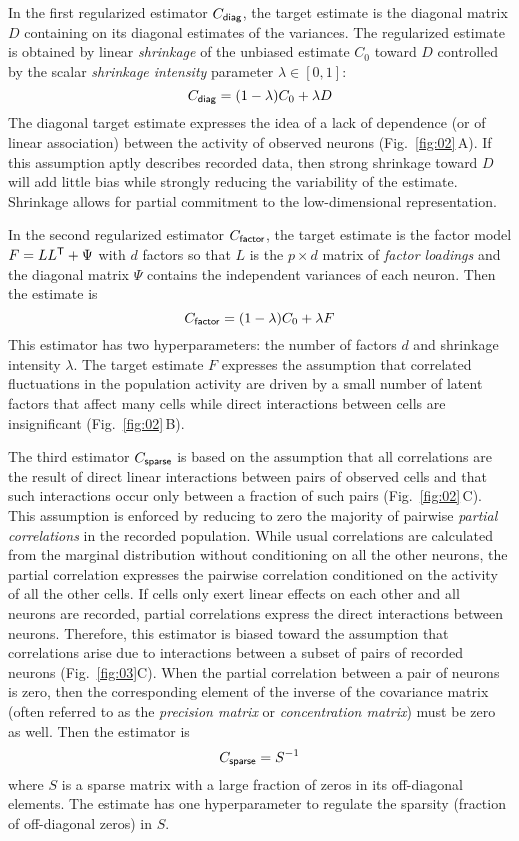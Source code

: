 \documentclass[10pt]{article}
\newcommand{\T}{{\sf T}}
\begin{document}
In the first regularized estimator $C_{\sf diag}$, the target estimate is the diagonal matrix $D$ containing on its diagonal estimates of the variances.
The regularized estimate is obtained by linear \emph{shrinkage} of the unbiased estimate $C_0$ toward $D$ controlled by the scalar \emph{shrinkage intensity} parameter $\lambda \in [0, 1]$:
\begin{equation}
C_{\sf diag} = (1-\lambda) C_0 + \lambda D
\end{equation}
The diagonal target estimate expresses the idea of a lack of dependence (or of linear association) between the activity of observed neurons (Fig.~\ref{fig:02}\,A).  
If this assumption aptly describes recorded data, then strong shrinkage toward $D$ will add little bias while strongly reducing the variability of the estimate. Shrinkage allows for partial commitment to the low-dimensional representation.  

In the second regularized estimator $C_{\sf factor}$, the target estimate is the factor model $F =  L L^\T + \Psi$ with $d$ factors so that $L$ is the $p\times d$ matrix of \emph{factor loadings} and the diagonal matrix $\Psi$ contains the independent variances of each neuron.
Then the estimate is 
\begin{equation}
C_{\sf factor} = (1-\lambda) C_0 + \lambda F
\end{equation}
This estimator has two hyperparameters: the number of factors $d$ and shrinkage intensity $\lambda$. The target estimate $F$ expresses the assumption that correlated fluctuations in the population activity are driven by a small number of latent factors that affect many cells while direct interactions between cells are insignificant (Fig.~\ref{fig:02}\,B).   

The third estimator $C_{\sf sparse}$ is based on the assumption that all correlations are the result of direct linear interactions between pairs of observed cells and that such interactions occur only between a fraction of such pairs (Fig.~\ref{fig:02}\,C).
This assumption is enforced by reducing to zero the majority of pairwise \emph{partial correlations} in the recorded population. 
While usual correlations are calculated from the marginal distribution without conditioning on all the other neurons, the partial correlation expresses the pairwise correlation conditioned on the activity of all the other cells.  
If cells only exert linear effects on each other and all neurons are recorded, partial correlations express the direct interactions between neurons. 
Therefore, this estimator is biased toward the assumption that correlations arise due to interactions between a subset of pairs of recorded neurons (Fig.~\ref{fig:03}C). When the partial correlation between a pair of neurons is zero, then the corresponding element of the inverse of the covariance matrix (often referred to as the \emph{precision matrix} or \emph{concentration matrix}) must be zero as well. Then the estimator is 
\begin{equation}
C_{\sf sparse} = S^{-1}
\end{equation}
where $S$ is a sparse matrix with a large fraction of zeros in its off-diagonal elements. The estimate has one hyperparameter to regulate the sparsity (fraction of off-diagonal zeros) in $S$.
\end{document}
